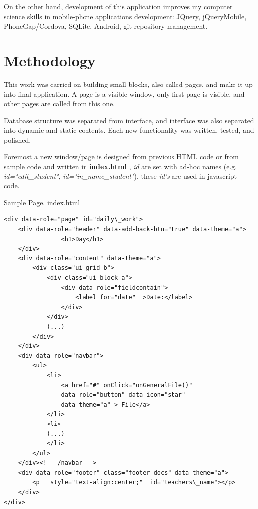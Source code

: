 	On the other hand, development of this application improves my computer science skills in  mobile-phone applications development: JQuery,  jQueryMobile, PhoneGap/Cordova, SQLite, Android,  git repository management.

\section {Methodology \label{Methodology}}
	This work was carried on building small blocks, also called pages, and make it up into final application.
	A page is a visible window, only first page is visible, and other pages are called from this one.
	
	 Database structure was separated from interface, and interface was also separated into dynamic and static contents. Each new
	 functionality was written, tested, and
	polished. 
	
	Foremost a new window/page is designed from previous HTML code or from sample code \cite{SergasApp} and written
	in {\bf index.html} , \emph{id} are set with ad-hoc names  (e.g. \emph{id="edit\_student"}, 
	   \emph{id="in\_name\_student"}),   these \emph{id's} are used in javascript code. 
	   
	   
\begin{bclogo}[couleur=blue!30,arrondi=0.1,ombre=true ] 
{Sample Page. index.html}
\begin{verbatim}
<div data-role="page" id="daily\_work">
    <div data-role="header" data-add-back-btn="true" data-theme="a">
                <h1>Day</h1>
    </div>
    <div data-role="content" data-theme="a">
        <div class="ui-grid-b">
            <div class="ui-block-a">
                <div data-role="fieldcontain">
                    <label for="date"  >Date:</label>
                </div>
            </div>
            (...)
        </div>
    </div>
    <div data-role="navbar">
        <ul>
            <li>
                <a href="#" onClick="onGeneralFile()"  
                data-role="button" data-icon="star"  
                data-theme="a" > File</a>
            </li>
            <li>
            (...)
            </li>
        </ul>
    </div><!-- /navbar -->
    <div data-role="footer" class="footer-docs" data-theme="a">
        <p   style="text-align:center;"  id="teachers\_name"></p>
    </div>
</div> 
\end{verbatim}

\end{bclogo}
	   
